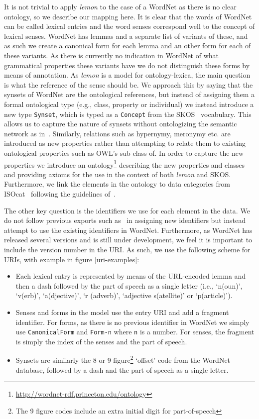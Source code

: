 \documentclass[10pt, a4paper]{article}
\newcommand{\lemon}[0]{\emph{lemon}}
\begin{document}
It is not trivial to apply \lemon{} to the case of a WordNet as there is no
clear ontology, so we describe our mapping here.
It is clear that the
words of WordNet can be called lexical entries and the word senses correspond
well to the concept of lexical senses. WordNet has lemmas and a separate list of
variants of these, and as such we create a canonical form for each lemma and an
other form for each of these variants. As there is currently no indication in
WordNet of what grammatical properties these variants have we do not distinguish
these forms by means of annotation. As \lemon{} is a model for
ontology-lexica, the main question is what the reference of the sense should be.
We approach this by saying that the synsets of WordNet are the ontological
references, but instead of assigning them a formal ontological type (e.g.,
class, property or individual) we instead introduce a new type {\tt Synset},
which is typed as a {\tt Concept} from the SKOS~\cite{miles2007skos} vocabulary.
This allows us to capture the nature of synsets without
ontologizing the semantic network as in~\cite{gangemi2003ontowordnet}.
Similarly, relations such as hypernymy, meronymy etc. are introduced as new
properties rather than attempting to relate them to existing ontological
properties such as OWL's sub class of. In order to capture the new properties we
introduce an ontology\footnote{\url{http://wordnet-rdf.princeton.edu/ontology}}
describing the new properties and classes and providing
axioms for the use in the context of both \lemon{} and SKOS. Furthermore, we
link the elements in the ontology to data categories from
ISOcat~\cite{kemps2008isocat} following the guidelines
of~\cite{windhouwer2012linking}.

The other key question is the identifiers we use for each element in the data.
We do not follow previous exports such as~\cite{van2006conversion} in assigning new identifiers
but instead attempt to use the existing identifiers in WordNet. Furthermore, as
WordNet has released several versions and is still under development, we feel it
is important to include the version number in the URI. As such, we use the
following scheme for URIs, with example in figure \ref{uri-examples}:

\begin{itemize}
  \item Each lexical entry is represented by means of the URL-encoded lemma and
    then a dash followed by the part of speech as a single letter (i.e., `n(oun)',
    `v(erb)', `a(djective)', `r (adverb)', `adjective s(atellite)' or `p(article)').
  \item Senses and forms in the model use the entry URI and add a fragment
    identifier. For forms, as there is no previous identifier in WordNet we
    simply use {\tt CanonicalForm} and {\tt Form-n} where {\tt n} is a number.
    For senses, the fragment is simply the index of the senses and the part of
    speech.
  \item Synsets are similarly the 8 or 9 figure\footnote{The 9 figure codes
      include an extra initial digit for part-of-speech} `offset' code from the WordNet
    database, followed by a dash and the part of speech as a single letter.
\end{itemize}
\end{document}
